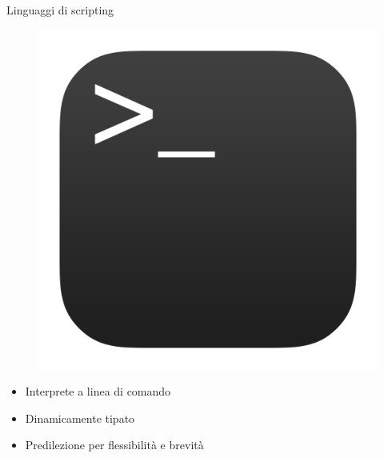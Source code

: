 \begin{frame}{Linguaggi di scripting}
	
	\begin{figure}
		\hfill
		\includegraphics[scale=0.045]{res/terminal}
	\end{figure}

	\begin{itemize}
		\item Interprete a linea di comando
		\item Dinamicamente tipato
		\item Predilezione per flessibilità e brevità
	\end{itemize}
	

\end{frame}

